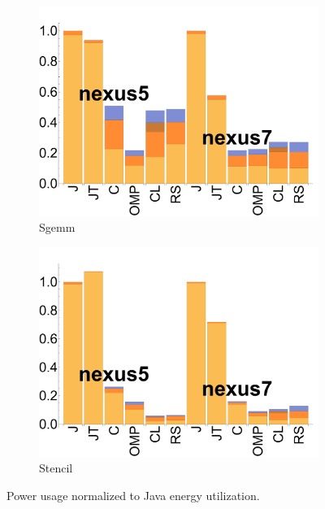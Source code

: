 \begin{figure}[tp]
  \begin{subfigure}[b]{0.24\textwidth}
      \centering
      \includegraphics[width=\textwidth]{data/bbattery_sgemm.pdf}
      \caption{Sgemm}\label{fig:b_Sgemm}
  \end{subfigure}

  \begin{subfigure}[b]{0.24\textwidth}
      \centering
      \includegraphics[width=\textwidth]{data/bbattery_stencil.pdf}
      \caption{Stencil} \label{fig:b_Stencil}
  \end{subfigure}

  \caption{Power usage normalized to Java energy utilization.}
\end{figure}
\FloatBarrier


